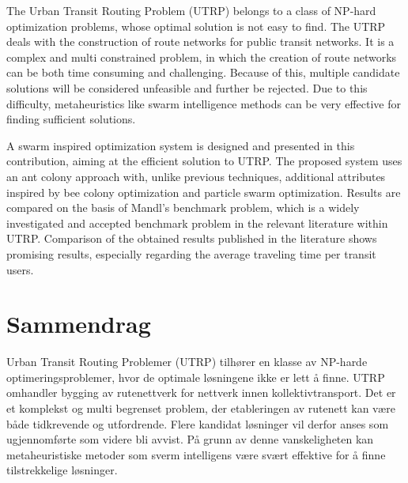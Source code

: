 

The Urban Transit Routing Problem (UTRP) belongs to a class of NP-hard optimization problems, whose optimal solution is not easy to find. The UTRP deals with the construction of route networks for public transit networks. It is a complex and multi constrained problem, in which the creation of route networks can be both time consuming and challenging. Because of this, multiple candidate solutions will be considered unfeasible and further be rejected. Due to this difficulty, metaheuristics like swarm intelligence methods can be very effective for finding sufficient solutions. 

A swarm inspired optimization system is designed and presented in this contribution, aiming at the efficient solution to UTRP. The proposed system uses an ant colony approach with, unlike previous techniques, additional attributes inspired by bee colony optimization and particle swarm optimization. Results are compared on the basis of Mandl's benchmark problem, which is a widely investigated and accepted benchmark problem in the relevant literature within UTRP. Comparison of the obtained results published in the literature shows promising results, especially regarding the average traveling time per transit users. 


\section*{Sammendrag}

Urban Transit Routing Problemer (UTRP) tilhører en klasse av NP-harde optimeringsproblemer, hvor de optimale løsningene ikke er lett å finne. UTRP omhandler bygging av rutenettverk for nettverk innen kollektivtransport. Det er et komplekst og multi begrenset problem, der etableringen av rutenett kan være både tidkrevende og utfordrende. Flere kandidat løsninger vil derfor anses som ugjennomførte som videre bli avvist. På grunn av denne vanskeligheten kan metaheuristiske metoder som sverm intelligens være svært effektive for å finne tilstrekkelige løsninger.

